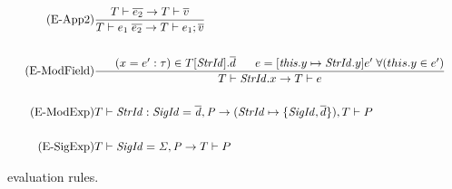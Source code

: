 \begin{figure}[htb]
\begin{align*}
\\
\\
\tag{E-App2}
&\frac{T \vdash \overline{e_{2}} \rightarrow T \vdash \overline{v}}
{T \vdash e_{1}\;\overline{e_{2}} \rightarrow T \vdash e_{1};\overline{v}}
\\
\\
\tag{E-ModField}
&\frac{\;\;\;\;\;\; (x=e':\tau) \in T[\mathit{StrId}].\overline{d} \;\;\;\;\;\; e=[\mathit{this}.y\mapsto \mathit{StrId}.y]e'\;\forall (this.y \in e')}
{T \vdash \mathit{StrId}.x \rightarrow T \vdash e}\\
\\
\tag{E-ModExp}
&T \vdash \mathit{StrId:SigId = \overline{d},P} \rightarrow (\mathit{StrId} \mapsto \lbrace \mathit{SigId},\overline{d}\rbrace), T \vdash P \\
\\
\tag{E-SigExp}
&T \vdash \mathit{SigId = \Sigma, P} \rightarrow T \vdash P
\end{align*}
\caption{\MiniML\ evaluation rules.\label{fig:MiniMLOperationalSemantics}}
\end{figure}
